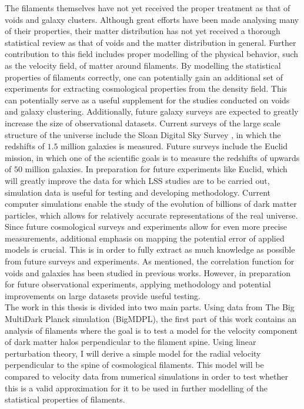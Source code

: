 The filaments themselves have not yet received the proper treatment as that of voids and galaxy clusters. Although great efforts have been made analysing many of their properties\cite{Libeskind_2017}, their matter distribution has not yet received a thorough statistical review as that of voids and the matter distribution in general. Further contribution to this field includes proper modelling of the physical behavior, such as the velocity field, of matter around filaments. By modelling the statistical properties of filaments correctly, one can potentially gain an additional set of experiments for extracting cosmological properties from the density field. This can potentially serve as a useful supplement for the studies conducted on voids and galaxy clustering. Additionally, future galaxy surveys are expected to greatly increase the size of observational datasets. Current surveys of the large scale structure of the universe include the Sloan Digital Sky Survey \cite{Eisenstein_2011}, in which the redshifts of $1.5$ million galaxies is measured. Future surveys include the Euclid mission, in which one of the scientific goals is to measure the redshifts of upwards of $50$ million galaxies\cite{eucliddefinition}. In preparation for future experiments like Euclid, which will greatly improve the data for which LSS studies are to be carried out, simulation data is useful for testing and developing methodology. Current computer simulations enable the study of the evolution of billions of dark matter particles\cite{Millennium}\cite{Multidark_dataset}, which allows for relatively accurate representations of the real universe. Since future cosmological surveys and experiments allow for even more precise measurements, additional emphasis on mapping the potential error of applied models is crucial. This is in order to fully extract as much knowledge as possible from future surveys and experiments. As mentioned, the correlation function for voids and galaxies has been studied in previous works. However, in preparation for future observational experiments, applying methodology and potential improvements on large datasets provide useful testing.\\\indent
The work in this thesis is divided into two main parts. Using data from The Big MultiDark Planck simulation (BigMDPL)\cite{Multidark_dataset}, the first part of this work contains an analysis of filaments where the goal is to test a model for the velocity component of dark matter halos perpendicular to the filament spine. Using linear perturbation theory, I will derive a simple model for the radial velocity perpendicular to the spine of cosmological filaments. This model will be compared to velocity data from numerical simulations in order to test whether this is a valid approximation for it to be used in further modelling of the statistical properties of filaments.
